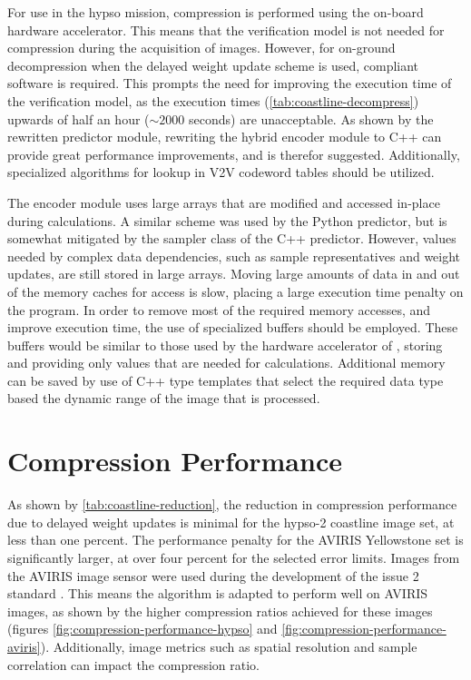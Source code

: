 For use in the \acrshort{hypso} mission, compression is performed using the on-board hardware accelerator. This means that the verification model is not needed for compression during the acquisition of images. However, for on-ground decompression when the delayed weight update scheme is used, compliant software is required. This prompts the need for improving the execution time of the verification model, as the execution times (\autoref{tab:coastline-decompress}) upwards of half an hour ($\sim2000$ seconds) are unacceptable. As shown by the rewritten predictor module, rewriting the hybrid encoder module to C++ can provide great performance improvements, and is therefor suggested. Additionally, specialized algorithms for lookup in \acrshort{V2V} codeword tables should be utilized.

The encoder module uses large arrays that are modified and accessed in-place during calculations. A similar scheme was used by the Python predictor, but is somewhat mitigated by the sampler class of the C++ predictor. However, values needed by complex data dependencies, such as sample representatives and weight updates, are still stored in large arrays. Moving large amounts of data in and out of the memory caches for access is slow, placing a large execution time penalty on the program. In order to remove most of the required memory accesses, and improve execution time, the use of specialized buffers should be employed. These buffers would be similar to those used by the hardware accelerator of \citeauthor{vorhaugHyperspectralImageCompression2024}, storing and providing only values that are needed for calculations. Additional memory can be saved by use of C++ type templates that select the required data type based the dynamic range of the image that is processed.

\section{Compression Performance}

As shown by \autoref{tab:coastline-reduction}, the reduction in compression performance due to delayed weight updates is minimal for the \acrshort{hypso}-2 coastline image set, at less than one percent. The performance penalty for the AVIRIS Yellowstone set is significantly larger, at over four percent for the selected error limits. Images from the AVIRIS image sensor were used during the development of the issue 2 standard \cite{LosslessMultispectralHyperspectral2022, blanesHYBRIDENTROPYENCODER}. This means the algorithm is adapted to perform well on AVIRIS images, as shown by the higher compression ratios achieved for these images (figures \ref{fig:compression-performance-hypso} and \ref{fig:compression-performance-aviris}). Additionally, image metrics such as spatial resolution and sample correlation can impact the compression ratio.

